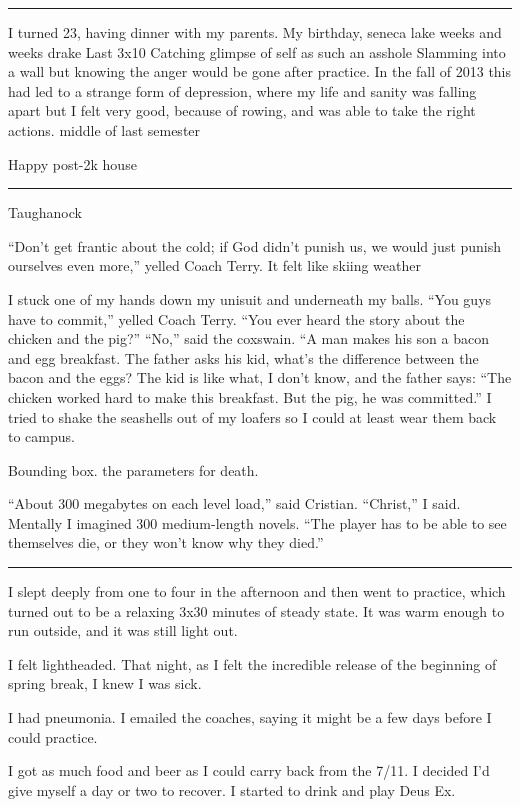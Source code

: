 \plainfancybreak{12pt}{2}{* * *}

I turned 23, having dinner with my parents.
My birthday, seneca lake
weeks and weeks
drake
Last 3x10
Catching glimpse of self as such an asshole
Slamming into a wall but knowing the anger would be gone after practice.  In the
fall of 2013 this had led to a strange form of depression, where my life and
sanity was falling apart but I felt very good, because of rowing, and was able
to take the right actions.
middle of last semester

Happy post-2k house

\plainfancybreak{12pt}{2}{* * *}

Taughanock 

``Don't get frantic about the cold; if God didn't punish us, we would just
punish ourselves even more,'' yelled Coach Terry.  It felt like skiing weather

I stuck one of my hands down my unisuit and underneath my balls.  ``You guys
have to commit,'' yelled Coach Terry.  ``You ever heard the story about the
chicken and the pig?'' ``No,'' said the coxswain.  ``A man makes his son a bacon
and egg breakfast.  The father asks his kid, what's the difference between the
bacon and the eggs?  The kid is like what, I don't know, and the father says:
``The chicken worked hard to make this breakfast.  But the pig, he was
committed.'' I tried to shake the seashells out of my loafers so I could at
least wear them back to campus. 

Bounding box.  the parameters for death.

``About 300 megabytes on each level load,'' said Cristian.  ``Christ,'' I said.
Mentally I imagined 300 medium-length novels.  ``The player has to be able to
see themselves die, or they won't know why they died.'' 


\plainfancybreak{12pt}{2}{* * *}

I slept deeply from one to four in the afternoon and then went to practice,
which turned out to be a relaxing 3x30 minutes of steady state.  It was warm
enough to run outside, and it was still light out.

I felt lightheaded.  That night, as I felt the incredible release of the
beginning of spring break, I knew I was sick.  

I had pneumonia.  I emailed the coaches, saying it might be a few days before I
could practice.

I got as much food and beer as I could carry back from the 7/11.  I decided I'd
give myself a day or two to recover.  I started to drink and play Deus Ex.  

